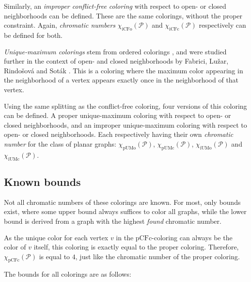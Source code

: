 \documentclass{article}
\begin{document}
Similarly, an \textit{improper conflict-free coloring} with respect to open- or closed neighborhoods can be defined. These are the same colorings, without the proper constraint. Again, \textit{chromatic numbers} $\chi_{\mathrm{iCFo}}(\mathcal{P})$ and $\chi_{\mathrm{iCFc}}(\mathcal{P})$ respectively can be defined for both.

\textit{Unique-maximum colorings} stem from ordered colorings \cite{KATCHALSKI1995141}, and were studied further in the context of open- and closed neighborhoods by Fabrici, Lužar, Rindošová and Soták \cite{fabrici2023proper}. This is a coloring where the maximum color appearing in the neighborhood of a vertex appears exactly once in the neighborhood of that vertex.

Using the same splitting as the conflict-free coloring, four versions of this coloring can be defined. A proper unique-maximum coloring with respect to open- or closed neighborhoods, and an improper unique-maximum coloring with respect to open- or closed neighborhoods. Each respectively having their own \textit{chromatic number} for the class of planar graphs: $\chi_{\mathrm{pUMo}}(\mathcal{P})$, $\chi_{\mathrm{pUMc}}(\mathcal{P})$, $\chi_{\mathrm{iUMo}}(\mathcal{P})$ and $\chi_{\mathrm{iUMc}}(\mathcal{P})$.

\subsection{Known bounds}

Not all chromatic numbers of these colorings are known. For most, only bounds exist, where some upper bound always suffices to color all graphs, while the lower bound is derived from a graph with the highest \textit{found} chromatic number. 

As the unique color for each vertex $v$ in the $\mathrm{pCFc}$-coloring can always be the color of $v$ itself, this coloring is exactly equal to the proper coloring. Therefore, $\chi_{\mathrm{pCFc}}(\mathcal{P})$ is equal to $4$, just like the chromatic number of the proper coloring.

The bounds for all colorings are as follows:
\end{document}
